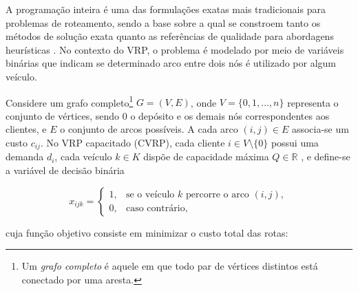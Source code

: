
A programação inteira é uma das formulações exatas mais tradicionais para problemas de roteamento, sendo a base sobre a qual se constroem tanto os métodos de solução exata quanto as referências de qualidade para abordagens heurísticas \cite{toth2002vehicle}. No contexto do VRP, o problema é modelado por meio de variáveis binárias que indicam se determinado arco entre dois nós é utilizado por algum veículo.

Considere um grafo completo\footnote{Um \textit{grafo completo} é aquele em que todo par de vértices distintos está conectado por uma aresta.} $G = (V, E)$, onde $V = \{0, 1, \ldots, n\}$ representa o conjunto de vértices, sendo $0$ o depósito e os demais nós correspondentes aos clientes, e $E$ o conjunto de arcos possíveis. A cada arco $(i,j) \in E$ associa-se um custo $c_{ij}$. No VRP capacitado (CVRP), cada cliente $i \in V \setminus \{0\}$ possui uma demanda $d_i$, cada veículo $k \in K$ dispõe de capacidade máxima $Q \in \mathbb{R}$ \cite{huang_solving_nodate}, e define-se a variável de decisão binária

\begin{equation}
    x_{ijk} =
    \begin{cases}
        1, & \text{se o veículo } k \text{ percorre o arco } (i,j), \\
        0, & \text{caso contrário,}
    \end{cases}
    \label{eq:var_decisao}
\end{equation}

\noindent cuja função objetivo consiste em minimizar o custo total das rotas:

